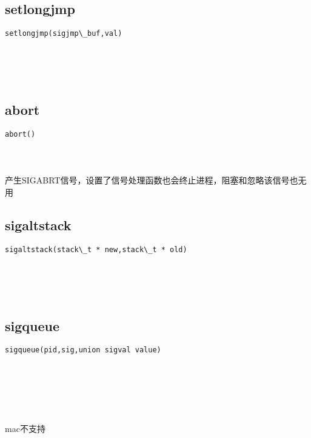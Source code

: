 \documentclass[10pt,a4paper]{article}
\begin{document}
\subsection{setlongjmp}
\begin{spacing}{2.0}
\lstset{language=C,numbers=none}
\begin{lstlisting}
setlongjmp(sigjmp\_buf,val)
\end{lstlisting}
{\large\color[rgb]{0.2,0.4,0.6}{sigjmp\_buf:}} \\
{\large\color[rgb]{0.2,0.4,0.6}{val:}}
\paragraph{ \ \ }
\end{spacing}

\subsection{abort}
\begin{spacing}{2.0}
\lstset{language=C,numbers=none}
\begin{lstlisting}
abort()
\end{lstlisting}
\paragraph{ \ \ }产生SIGABRT信号，设置了信号处理函数也会终止进程，阻塞和忽略该信号也无用
\end{spacing}

\subsection{sigaltstack}
\begin{spacing}{2.0}
\lstset{language=C,numbers=none}
\begin{lstlisting}
sigaltstack(stack\_t * new,stack\_t * old)
\end{lstlisting}
{\large\color[rgb]{0.2,0.4,0.6}{new:}} \\
{\large\color[rgb]{0.2,0.4,0.6}{old:}}
\paragraph{ \ \ }
\end{spacing}

\subsection{sigqueue}
\begin{spacing}{2.0}
\lstset{language=C,numbers=none}
\begin{lstlisting}
sigqueue(pid,sig,union sigval value)
\end{lstlisting}
{\large\color[rgb]{0.2,0.4,0.6}{pid:}} \\
{\large\color[rgb]{0.2,0.4,0.6}{sig:}} \\
{\large\color[rgb]{0.2,0.4,0.6}{value:}}
\paragraph{ \ \ }mac不支持
\end{spacing}
\end{document}
